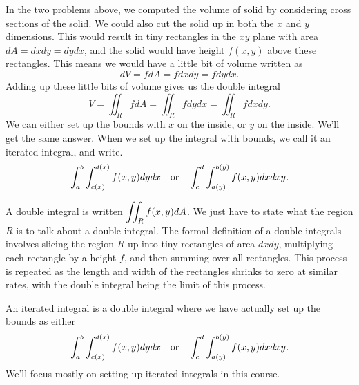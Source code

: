 


In the two problems above, we computed the volume of solid by considering cross sections of the solid.  We could also cut the solid up in both the $x$ and $y$ dimensions.  This would result in tiny rectangles in the $xy$ plane with area $dA=dxdy=dydx$, and the solid would have height $f(x,y)$ above these rectangles.  This means we would have a little bit of volume written as  
$$dV=fdA=fdxdy=fdydx.$$ 
Adding up these little bits of volume gives us the double integral 
$$V = \iint_R fdA=\iint_R fdydx=\iint_R fdxdy.$$
We can either set up the bounds with $x$ on the inside, or $y$ on the inside. We'll get the same answer.  When we set up the integral with bounds, we call it an iterated integral, and write.
$$\displaystyle \int_a^b \int_{c(x)}^{d(x)}f(x,y)dydx \quad \text{or} \quad
\displaystyle \int_c^d \int_{a(y)}^{b(y)}f(x,y)dxdxy.$$

\begin{definition}
A double integral is written $\displaystyle \iint_R f(x,y)dA$.  We just have to state what the region $R$ is to talk about a double integral. The formal definition of a double integrals involves slicing the region $R$ up into tiny rectangles of area $dxdy$, multiplying each rectangle by a height $f$, and then summing over all rectangles. This process is repeated as the length and width of the rectangles shrinks to zero at similar rates, with the double integral being the limit of this process. 

An iterated integral is a double integral where we have actually set up 
the bounds as either 
$$\displaystyle \int_a^b \int_{c(x)}^{d(x)}f(x,y)dydx \quad \text{or} \quad
\displaystyle \int_c^d \int_{a(y)}^{b(y)}f(x,y)dxdxy.$$
We'll focus mostly on setting up iterated integrals in this course. 
\end{definition}






